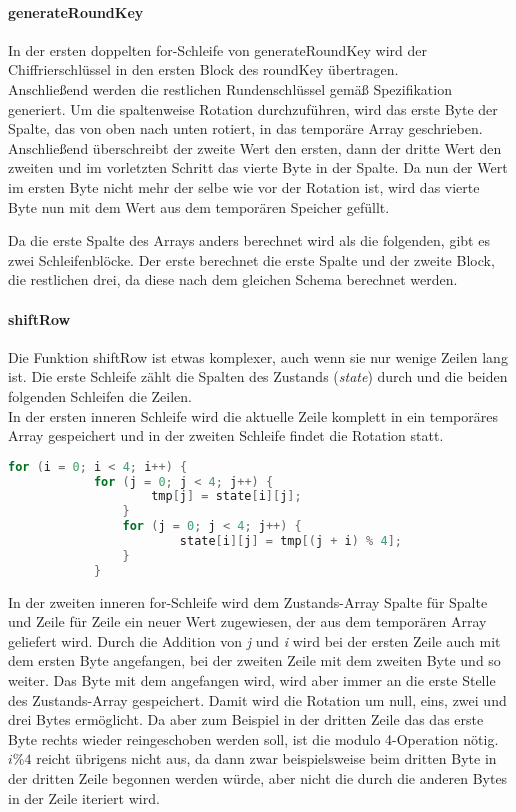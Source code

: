		\paragraph{generateRoundKey}
		In der ersten doppelten for-Schleife von generateRoundKey wird der Chiffrierschlüssel
		in den ersten Block des roundKey übertragen. \\
		Anschließend werden die restlichen Rundenschlüssel gemäß Spezifikation generiert.
		Um die spaltenweise Rotation durchzuführen, wird das erste Byte der Spalte, das von
		oben nach unten rotiert, in das temporäre Array geschrieben. Anschließend
		überschreibt der zweite Wert den ersten, dann der dritte Wert den zweiten und im
		vorletzten Schritt das vierte Byte in der Spalte. Da nun der Wert im ersten Byte
		nicht mehr der selbe wie vor der Rotation ist, wird das vierte Byte nun mit dem
		Wert aus dem temporären Speicher gefüllt.

		Da die erste Spalte des Arrays anders berechnet wird als die folgenden, gibt es
		zwei Schleifenblöcke. Der erste berechnet die erste Spalte und der zweite Block,
		die restlichen drei, da diese nach dem gleichen Schema berechnet werden.

		\paragraph{shiftRow}
		Die Funktion shiftRow ist etwas komplexer, auch wenn sie nur wenige Zeilen lang ist.
		Die erste Schleife zählt die Spalten des Zustands (\emph{state}) durch und die
		beiden folgenden Schleifen die Zeilen. \\
		In der ersten inneren Schleife wird die aktuelle Zeile komplett in ein temporäres
		Array gespeichert und in der zweiten Schleife findet die Rotation statt.

		\begin{lstlisting}[language=C]
		for (i = 0; i < 4; i++) {
			for (j = 0; j < 4; j++) {
		        	tmp[j] = state[i][j];
		        }
	        	for (j = 0; j < 4; j++) {
	            		state[i][j] = tmp[(j + i) % 4];
	        	}
    		}
		\end{lstlisting}

		In der zweiten inneren for-Schleife wird dem Zustands-Array Spalte für Spalte und
		Zeile für Zeile ein neuer Wert zugewiesen, der aus dem temporären Array geliefert
		wird. Durch die Addition von \emph{j} und \emph{i} wird bei der ersten Zeile auch
		mit dem ersten Byte angefangen, bei der zweiten Zeile mit dem zweiten Byte und so
		weiter. Das Byte mit dem angefangen wird, wird aber immer an die erste Stelle des
		Zustands-Array gespeichert. Damit wird die Rotation um null, eins, zwei und drei
		Bytes ermöglicht. Da aber zum Beispiel in der dritten Zeile das
		das erste Byte rechts wieder reingeschoben werden soll, ist die modulo 4-Operation
		nötig. \\
		$i \% 4$ reicht übrigens nicht aus, da dann zwar beispielsweise beim dritten Byte
		in der dritten Zeile begonnen werden würde, aber nicht die durch die
		anderen Bytes in der Zeile iteriert wird. 

